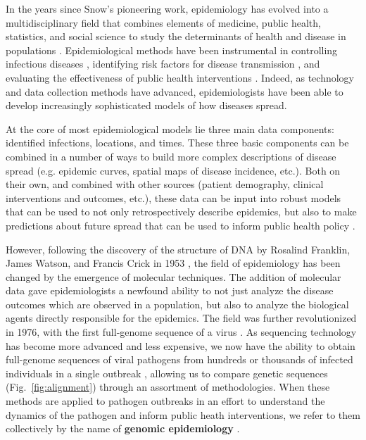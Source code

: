 In the years since Snow's pioneering work, epidemiology has evolved into a multidisciplinary field that combines elements of medicine, public health, statistics, and social science to study the determinants of health and disease in populations \citep{rothman2024epidemiology}.
Epidemiological methods have been instrumental in controlling infectious diseases \citep{singh2017rabies}, identifying risk factors for disease transmission \citep{chen2007sexual}, and evaluating the effectiveness of public health interventions \citep{alfano2020efficacy}.
Indeed, as technology and data collection methods have advanced, epidemiologists have been able to develop increasingly sophisticated models of how diseases spread.

At the core of most epidemiological models lie three main data components: identified infections, locations, and times.
These three basic components can be combined in a number of ways to build more complex descriptions of disease spread (e.g. epidemic curves, spatial maps of disease incidence, etc.).
Both on their own, and combined with other sources (patient demography, clinical interventions and outcomes, etc.), these data can be input into robust models that can be used to not only retrospectively describe epidemics, but also to make predictions about future spread that can be used to inform public health policy \citep{colon2021probabilistic}.

However, following the discovery of the structure of DNA by Rosalind Franklin, James Watson, and Francis Crick in 1953 \citep{franklin1953molecular,watson1953molecular}, the field of epidemiology has been changed by the emergence of molecular techniques.
The addition of molecular data gave epidemiologists a newfound ability to not just analyze the disease outcomes which are observed in a population, but also to analyze the biological agents directly responsible for the epidemics.
The field was further revolutionized in 1976, with the first full-genome sequence of a virus \citep{fiers1976complete}.
As sequencing technology has become more advanced and less expensive, we now have the ability to obtain full-genome sequences of viral pathogens from hundreds or thousands of infected individuals in a single outbreak \citep{du2021establishment}, allowing us to compare genetic sequences (Fig.~\ref{fig:alignment}) through an assortment of methodologies.
When these methods are applied to pathogen outbreaks in an effort to understand the dynamics of the pathogen and inform public heath interventions, we refer to them collectively by the name of \textbf{genomic epidemiology} \citep{armstrong2019pathogen,black2024applied}.

